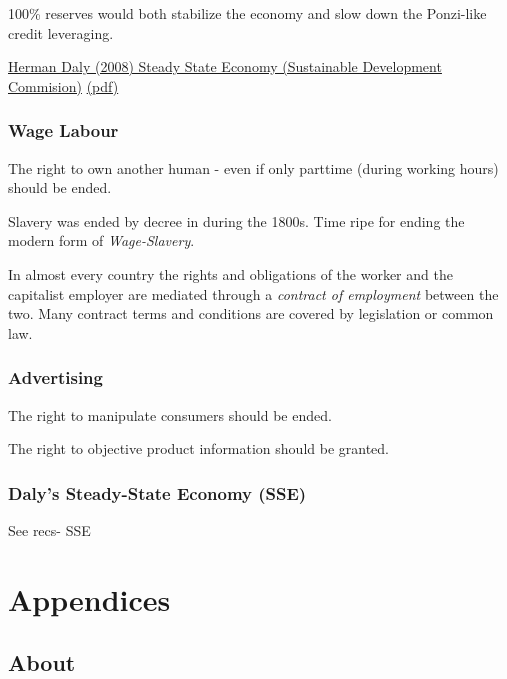 \documentclass[
]{book}
\begin{document}
100\% reserves would both stabilize the economy and slow down the Ponzi-like
credit leveraging.

\href{http://\%20www.sd-commission.org.uk/publications.php@id=775.html}{Herman Daly (2008) Steady State Economy (Sustainable Development Commision)}
\href{pdf/Daly_2008_Steady_State_Economy_SD_Commision.pdf}{(pdf)}

\hypertarget{wage-labour-1}{%
\section{Wage Labour}\label{wage-labour-1}}

The right to own another human - even if only parttime (during working hours) should be ended.

Slavery was ended by decree in during the 1800s.
Time ripe for ending the modern form of \emph{Wage-Slavery}.

In almost every country the rights and obligations of the worker and the capitalist employer
are mediated through a \emph{contract of employment} between the two.
Many contract terms and conditions are covered by legislation or common law.

\hypertarget{advertising-1}{%
\section{Advertising}\label{advertising-1}}

The right to manipulate consumers should be ended.

The right to objective product information should be granted.

\hypertarget{dalys-steady-state-economy-sse}{%
\section{Daly's Steady-State Economy (SSE)}\label{dalys-steady-state-economy-sse}}

See recs- SSE

\hypertarget{part-appendices}{%
\part{Appendices}\label{part-appendices}}

\hypertarget{appendix-appendices}{%
\appendix}


\hypertarget{about}{%
\chapter{About}\label{about}}
\end{document}

